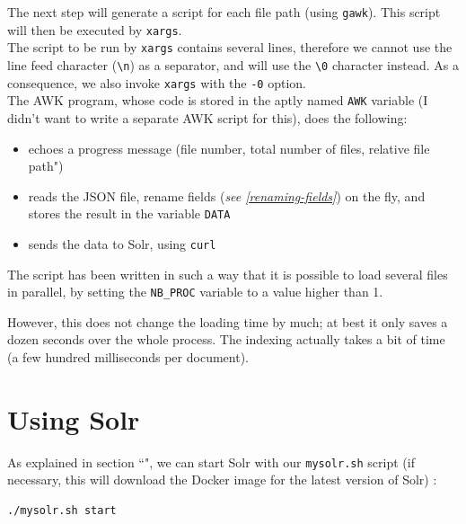 The next step will generate a script for each file path (using \texttt{gawk}). This script will then be executed by \texttt{xargs}. \\

The script to be run by \texttt{xargs} contains several lines, therefore we cannot use the line feed character (\lstinline|\n|) as a separator, and will use the \lstinline|\0| character instead. As a consequence, we also invoke \texttt{xargs} with the \texttt{-0} option. \\

The AWK program, whose code is stored in the aptly named \texttt{AWK} variable (I didn't want to write a separate AWK script for this), does the following:
\begin{itemize}
	\item echoes a progress message (file number, total number of files, relative file path")
	
	\item reads the JSON file, rename fields (\emph{see \ref{renaming-fields}}) on the fly, and stores the result in the variable \texttt{DATA}
	
	\item sends the data to Solr, using \texttt{curl}
\end{itemize}

\bigskip

The script has been written in such a way that it is possible to load several files in parallel, by setting the \texttt{NB\_PROC} variable to a value higher than 1.

However, this does not change the loading time by much; at best it only saves a dozen seconds over the whole process. The indexing actually takes a bit of time (a few hundred milliseconds per document). \\




\newpage

\section{Using Solr} \label{using-solr}

As explained in section ``", we can start Solr with our \texttt{mysolr.sh} script (if necessary, this will download the Docker image for the latest version of Solr) : \\


\begin{lstlisting}[language=sh]
./mysolr.sh start
\end{lstlisting}

